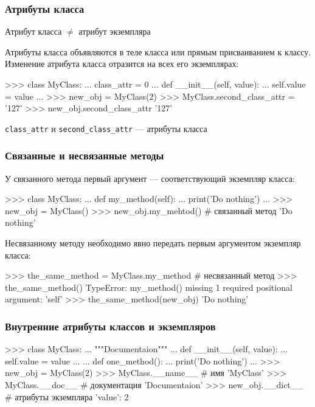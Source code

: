 \documentclass[fleqn, xcolor=x11names, 11pt]{beamer}
\begin{document}
\begin{frame}[fragile]\frametitle{Атрибуты класса}

Атрибут класса $\neq$ атрибут экземпляра

\hfill

Атрибуты класса объявляются в теле класса или прямым присваиванием к классу. Изменение атрибута класса отразится на всех его экземплярах:

\begin{pcode}
>>> class MyClass:
...    class_attr = 0
...    def __init__(self, value):
...        self.value = value
...    
>>> new_obj = MyClass(2)
>>> MyClass.second_class_attr = '127'
>>> new_obj.second_class_attr
'127'
\end{pcode}

\hfill

\texttt{class_attr} и \texttt{second_class_attr} --- атрибуты класса

\end{frame}

\begin{frame}[fragile]\frametitle{Связанные и несвязанные методы}
У связанного метода первый аргумент --- соответствующий экземпляр класса:
\begin{pcode}
>>> class MyClass:
...    def my_method(self):
...        print('Do nothing')
...
>>> new_obj = MyClass()
>>> new_obj.my_mehtod() # связанный метод
'Do nothing'
\end{pcode}

\hfill

Несвязанному методу необходимо явно передать первым аргументом экземпляр класса:
\begin{pcode}
>>> the_same_method = MyClass.my_method # несвязанный метод
>>> the_same_method()
TypeError: my_method() missing 1 required positional 
argument: 'self'
>>> the_same_method(new_obj)
'Do nothing'
\end{pcode}

\hfill

\end{frame}

\begin{frame}[fragile]\frametitle{Внутренние атрибуты классов и экземпляров}

\begin{pcode}
>>> class MyClass:
...    """Documentaion"""
...    def __init__(self, value):
...        self.value = value
...        
...    def one_method():
...        print('Do nothing')
...
>>> new_obj = MyClass(2)
>>> MyClass.__name__ # имя
'MyClass'
>>> MyClass.__doc__ # документация
'Documentaion'
>>> new_obj.__dict__ # атрибуты экземпляра
{'value': 2}
\end{pcode}


\end{frame}
\end{document}
